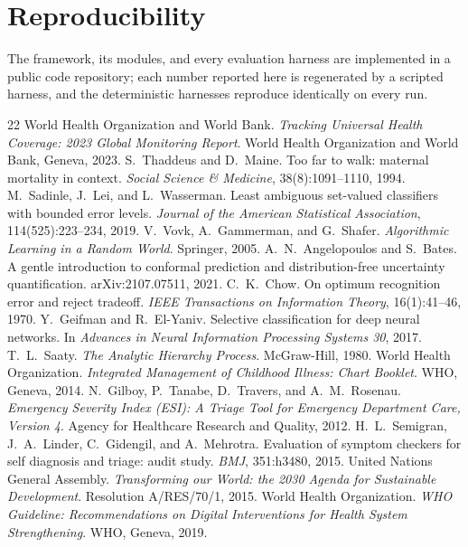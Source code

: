 \documentclass[11pt]{article}
\begin{document}
\section*{Reproducibility}
The framework, its modules, and every evaluation harness are implemented in a public code repository; each
number reported here is regenerated by a scripted harness, and the deterministic harnesses reproduce
identically on every run.

\begin{thebibliography}{22}
 World Health Organization and World Bank. \emph{Tracking Universal Health Coverage: 2023
Global Monitoring Report}. World Health Organization and World Bank, Geneva, 2023.
 S.~Thaddeus and D.~Maine. Too far to walk: maternal mortality in context.
\emph{Social Science \& Medicine}, 38(8):1091--1110, 1994.
 M.~Sadinle, J.~Lei, and L.~Wasserman. Least ambiguous set-valued classifiers with bounded
error levels. \emph{Journal of the American Statistical Association}, 114(525):223--234, 2019.
 V.~Vovk, A.~Gammerman, and G.~Shafer. \emph{Algorithmic Learning in a Random World}. Springer,
2005.
 A.~N.~Angelopoulos and S.~Bates. A gentle introduction to conformal prediction and
distribution-free uncertainty quantification. arXiv:2107.07511, 2021.
 C.~K.~Chow. On optimum recognition error and reject tradeoff. \emph{IEEE Transactions on
Information Theory}, 16(1):41--46, 1970.
 Y.~Geifman and R.~El-Yaniv. Selective classification for deep neural networks. In
\emph{Advances in Neural Information Processing Systems 30}, 2017.
 T.~L.~Saaty. \emph{The Analytic Hierarchy Process}. McGraw-Hill, 1980.
 World Health Organization. \emph{Integrated Management of Childhood Illness: Chart Booklet}.
WHO, Geneva, 2014.
 N.~Gilboy, P.~Tanabe, D.~Travers, and A.~M.~Rosenau. \emph{Emergency Severity Index (ESI): A
Triage Tool for Emergency Department Care, Version 4}. Agency for Healthcare Research and Quality, 2012.
 H.~L.~Semigran, J.~A.~Linder, C.~Gidengil, and A.~Mehrotra. Evaluation of symptom checkers
for self diagnosis and triage: audit study. \emph{BMJ}, 351:h3480, 2015.
 United Nations General Assembly. \emph{Transforming our World: the 2030 Agenda for
Sustainable Development}. Resolution A/RES/70/1, 2015.
 World Health Organization. \emph{WHO Guideline: Recommendations on Digital Interventions
for Health System Strengthening}. WHO, Geneva, 2019.

\end{thebibliography}
\end{document}
